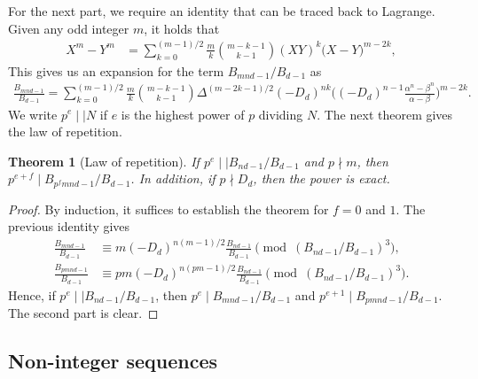 \documentclass[12pt]{article}
\theoremstyle{plain}
\newtheorem{theorem}{Theorem}
\theoremstyle{definition}
\theoremstyle{remark}
\begin{document}
For the next part, we require an identity that can be traced back to Lagrange. Given any odd integer $ m $, it holds that
\begin{align*}
	X^m - Y^m &= \sum_{k = 0}^{(m - 1)/2} \frac{m}{k} \binom{m - k - 1}{k - 1} (XY)^k \bigg( X - Y \bigg)^{m - 2k},
\end{align*}
This gives us an expansion for the term $ B_{mnd - 1}/B_{d - 1} $ as
\begin{align*}
	\frac{B_{mnd - 1}}{B_{d - 1}} = \sum_{k = 0}^{(m - 1)/2} \frac{m}{k} \binom{m - k - 1}{k - 1} \Delta^{(m - 2k - 1)/2} (-D_d)^{nk} \bigg( (-D_d)^{n - 1} \frac{\alpha^n - \beta^n}{\alpha - \beta} \bigg)^{m - 2k}.
\end{align*}
We write $ p^e \mid \mid N $ if $ e $ is the highest power of $ p $ dividing $ N $. The next theorem gives the law of repetition.
\begin{theorem} [Law of repetition]  \label{Th:Law_of_Repetition} If $ p^e \mid \mid B_{nd - 1}/B_{d - 1} $ and $ p \nmid m $, then $ p^{e + f} \mid B_{p^f mnd - 1}/B_{d - 1} $. In addition, if $ p \nmid D_d $, then the power is exact.	
\end{theorem}

\begin{proof} By induction, it suffices to establish the theorem for $ f = 0 $ and $ 1 $. The previous identity gives
\begin{align*}
	\frac{B_{mnd - 1}}{B_{d - 1}} &\equiv m (-D_d)^{n(m - 1)/2} \frac{B_{nd - 1}}{B_{d - 1}} \pmod{(B_{nd - 1}/B_{d - 1})^3}, \\
	\frac{B_{pmnd - 1}}{B_{d - 1}} &\equiv pm (-D_d)^{n(pm - 1)/2} \frac{B_{nd - 1}}{B_{d - 1}} \pmod{(B_{nd - 1}/B_{d - 1})^3}.
\end{align*}
Hence, if $ p^e \mid \mid B_{nd - 1}/B_{d - 1} $, then $ p^e \mid B_{mnd - 1}/B_{d - 1} $ and $ p^{e + 1} \mid B_{pmnd - 1}/B_{d - 1} $. The second part is clear.
\end{proof}

\subsection{Non-integer sequences}
\end{document}
